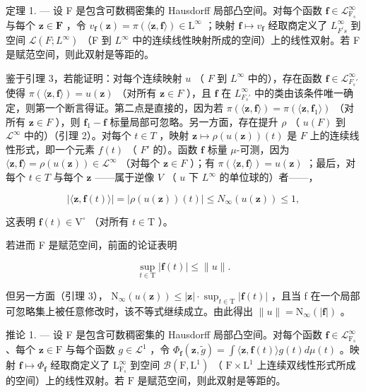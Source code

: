定理 1. --- 设 F 是包含可数稠密集的 Hausdorff 局部凸空间。对每个函数 \(\mathbf{f} \in \mathcal{L}_{\mathrm{F}_s}^\infty\) 与每个 \(\mathbf{z} \in \mathbf{F}\) ，令 \(v_{\mathbf{f}}(\mathbf{z}) = \pi (\langle \mathbf{z}, \mathbf{f} \rangle) \in \mathrm{L}^{\infty}\) ；映射 \(\mathbf{f} \mapsto v_{\mathbf{f}}\) 经取商定义了 \(L_{F^{\prime}s}^{\infty}\) 到空间 \(\mathcal{L}(F;L^{\infty})\) （F 到 \(L^{\infty}\) 中的连续线性映射所成的空间）上的线性双射。若 F 是赋范空间，则此双射是等距的。

鉴于引理 3，若能证明：对每个连续映射 \(u\) （ \(F\) 到 \(L^{\infty}\) 中的），存在函数 \(\mathbf{f} \in \mathcal{L}_{F_s'}^{\infty}\) 使得 \(\pi(\langle \mathbf{z}, \mathbf{f} \rangle) = u(\mathbf{z})\) （对所有 \(\mathbf{z} \in F\) ），且 \(\mathbf{f}\) 在 \(L_{F_s'}^{\infty}\) 中的类由该条件唯一确定，则第一个断言得证。第二点是直接的，因为若 \(\pi(\langle \mathbf{z}, \mathbf{f} \rangle) = \pi(\langle \mathbf{z}, \mathbf{f}_1 \rangle)\) （对所有 \(\mathbf{z} \in F\) ），则 \(\mathbf{f}_1 - \mathbf{f}\) 标量局部可忽略。另一方面，存在提升 \(\rho\) （ \(u(F)\) 到 \(\mathcal{L}^{\infty}\) 中的）（引理 2）。对每个 \(t \in T\) ，映射 \(\mathbf{z} \mapsto \rho(u(\mathbf{z}))(t)\) 是 \(F\) 上的连续线性形式，即一个元素 \(f(t)\) （ \(F'\) 的）。函数 \(\mathbf{f}\) 标量 \(\mu\)-可测，因为 \(\langle \mathbf{z}, \mathbf{f} \rangle = \rho(u(\mathbf{z})) \in \mathcal{L}^{\infty}\) （对每个 \(\mathbf{z} \in F\) ）；有 \(\pi(\langle \mathbf{z}, \mathbf{f} \rangle) = u(\mathbf{z})\) ；最后，对每个 \(t \in T\) 与每个 \(\mathbf{z}\) ——属于逆像 \(V\) （ \(u\) 下 \(L^{\infty}\) 的单位球的）者——，

\[
\left| \langle \mathbf {z}, \mathbf {f} (t) \rangle \right| = \left| \rho (u (\mathbf {z})) (t) \right| \leqslant N _ {\infty} (u (\mathbf {z})) \leqslant 1,
\]

这表明 \(\mathbf{f}(t) \in \mathrm{V}^{\circ}\) （对所有 \(t \in \mathrm{T}\) ）。

若进而 F 是赋范空间，前面的论证表明

\[
\sup _ {t \in \mathrm{T}} | \mathbf {f} (t) | \leqslant \| u \|.
\]

但另一方面（引理 3）， \(\mathrm{N}_{\infty}(u(\mathbf{z})) \leqslant |\mathbf{z}| \cdot \sup_{t \in \mathrm{T}} |\mathbf{f}(t)|\) ，且当 f 在一个局部可忽略集上被任意修改时，该不等式继续成立。由此得出 \(\|u\| = \mathrm{N}_{\infty}(|\mathbf{f}|)\) 。

推论 1. --- 设 F 是包含可数稠密集的 Hausdorff 局部凸空间。对每个函数 \(\mathbf{f} \in \mathcal{L}_{\mathrm{F}_s}^\infty\) 、每个 \(\mathbf{z} \in \mathrm{F}\) 与每个函数 \(g \in \mathcal{L}^1\) ，令 \(\Phi_{\mathbf{f}}(\mathbf{z}, \widetilde{g}) = \int \langle \mathbf{z}, \mathbf{f}(t) \rangle g(t) d\mu(t)\) 。映射 \(\mathbf{f} \mapsto \Phi_{\mathbf{f}}\) 经取商定义了 \(\mathrm{L}_{\mathrm{F}_s}^\infty\) 到空间 \(\mathcal{B}(\mathrm{F}, \mathrm{L}^1)\) （ \(\mathrm{F} \times \mathrm{L}^1\) 上连续双线性形式所成的空间）上的线性双射。若 \(\mathrm{F}\) 是赋范空间，则此双射是等距的。

